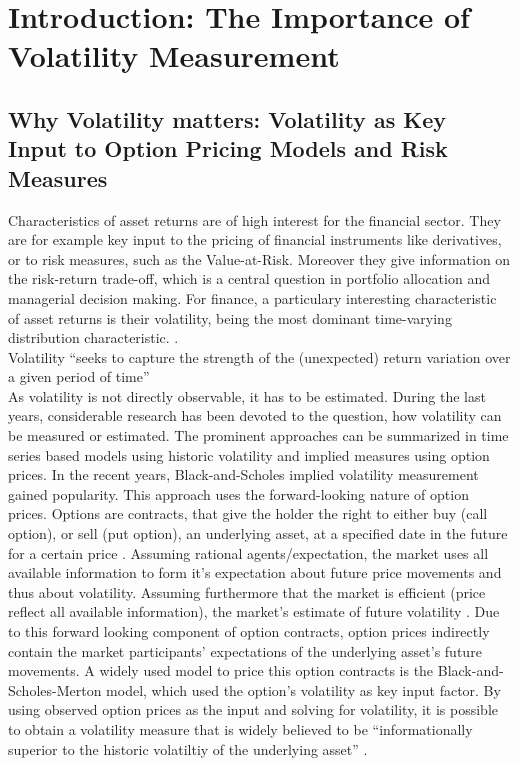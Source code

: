 
\section{Introduction: The Importance of Volatility Measurement}

\subsection{Why Volatility matters: Volatility as Key Input to Option Pricing Models and Risk Measures}
Characteristics of asset returns are of high interest for the financial sector. They are for example key input to the pricing of financial instruments like derivatives, or to risk measures, such as the Value-at-Risk. Moreover they give information on the risk-return trade-off, which is a central question in portfolio allocation and managerial decision making. For finance, a particulary interesting characteristic of asset returns is their volatility, being the most dominant time-varying distribution characteristic. \parencite{andersen2018}.\\
Volatility ``seeks to capture the strength of the (unexpected) return variation over a given period of time'' \parencite[p.7]{andersen2001}\\
As volatility is not directly observable, it has to be estimated. During the last years, considerable research has been devoted to the question, how volatility can be measured or estimated. The prominent approaches can be summarized in time series based models using historic volatility and implied measures using option prices. In the recent years, Black-and-Scholes implied volatility measurement gained popularity. This approach uses the forward-looking nature of option prices. Options are contracts, that give the holder the right to either buy (call option), or sell (put option), an underlying asset, at a specified date in the future for a certain price \parencite{hull2006}. Assuming rational agents/expectation, the market uses all available information to form it's expectation about future price movements and thus about volatility. Assuming furthermore that the market is efficient (price reflect all available information), the market's estimate of future volatility  \parencite{christensen2002}. Due to this forward looking component of option contracts, option prices indirectly contain the market participants' expectations of the underlying asset's future movements. A widely used model to price this option contracts is the Black-and-Scholes-Merton model, which used the option's volatility as key input factor. By using observed option prices as the input and solving for volatility, it is possible to obtain a volatility measure that is widely believed to be ``informationally superior to the historic volatiltiy of the underlying asset'' \parencite[p.1305]{jiang2003}.\\
